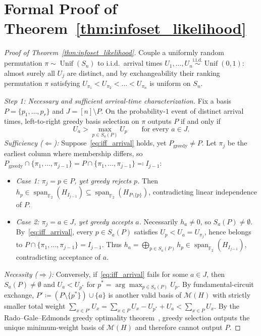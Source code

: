 \documentclass[12pt]{article}
\theoremstyle{definition}
\newcommand{\Ftwo}{\mathbb{F}_2}
\DeclareMathOperator{\Unif}{Unif}
\begin{document}
\section{Formal Proof of \texorpdfstring{Theorem~\ref{thm:infoset_likelihood}}{Theorem 4}}\label{app:infoset_proof}

\begin{proof}[Proof of Theorem~\ref{thm:infoset_likelihood}]
Couple a uniformly random permutation $\pi \sim \Unif(S_n)$ to i.i.d.\ arrival times $U_1, \dots, U_n
\stackrel{\mathrm{i.i.d.}}{\sim} \Unif(0, 1)$: almost surely all $U_j$ are distinct, and by exchangeability their
ranking permutation $\pi$ satisfying $U_{\pi_1} < U_{\pi_2} < \dots < U_{\pi_n}$ is uniform on $S_n$.

\emph{Step 1: Necessary and sufficient arrival-time characterization.} Fix a basis $P = \{p_1, \dots, p_r\}$ and
$J = [n] \setminus P$. On the probability-$1$ event of distinct arrival times, left-to-right greedy basis selection
on $\pi$ outputs $P$ if and only if
\begin{equation}\label{eq:iff_arrival}
  U_a > \max_{p \in S_a(P)} U_p \qquad \text{for every } a \in J.
\end{equation}
\emph{Sufficiency ($\Leftarrow$):} Suppose~\eqref{eq:iff_arrival} holds, yet $P_{\mathrm{greedy}} \neq P$. Let
$\pi_j$ be the earliest column where membership differs, so $P_{\mathrm{greedy}} \cap \{\pi_1, \dots, \pi_{j-1}\} =
P \cap \{\pi_1, \dots, \pi_{j-1}\} \eqqcolon I_{j-1}$:
\begin{itemize}
  \item \emph{Case 1: $\pi_j = p \in P$, yet greedy rejects $p$.} Then $h_p \in
    \operatorname{span}_{\Ftwo}(H_{I_{j-1}}) \subseteq \operatorname{span}_{\Ftwo}(H_{P \setminus \{p\}})$,
    contradicting linear independence of $P$.
  \item \emph{Case 2: $\pi_j = a \in J$, yet greedy accepts $a$.} Necessarily $h_a \neq 0$, so $S_a(P) \neq
    \emptyset$. By~\eqref{eq:iff_arrival}, every $p \in S_a(P)$ satisfies $U_p < U_a = U_{\pi_j}$, hence belongs to
    $P \cap \{\pi_1, \dots, \pi_{j-1}\} = I_{j-1}$. Thus $h_a = \bigoplus_{p \in S_a(P)} h_p \in
    \operatorname{span}_{\Ftwo}(H_{I_{j-1}})$, contradicting acceptance of $a$.
\end{itemize}
\emph{Necessity ($\Rightarrow$):} Conversely, if~\eqref{eq:iff_arrival} fails for some $a \in J$, then $S_a(P) \neq
\emptyset$ and $U_a < U_{p^*}$ for $p^* = \arg\max_{p \in S_a(P)} U_p$. By fundamental-circuit exchange, $P'
\coloneqq (P \setminus \{p^*\}) \cup \{a\}$ is another valid basis of $\mathcal{M}(H)$ with strictly smaller total
weight $\sum_{x \in P'} U_x = \sum_{x \in P} U_x - U_{p^*} + U_a < \sum_{x \in P} U_x$. By the Rado--Gale--Edmonds
greedy optimality theorem~\cite{Rado1957,Gale1968,Edmonds1971}, greedy selection outputs the unique minimum-weight
basis of $\mathcal{M}(H)$ and therefore cannot output $P$.


\end{proof}
\end{document}
